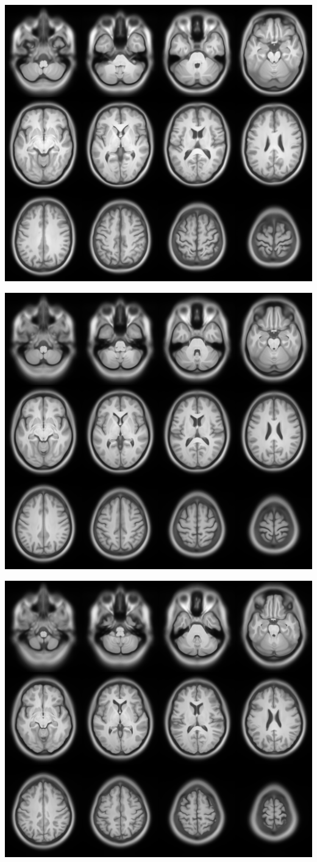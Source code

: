 \documentclass{beamer}
\begin{document}
\begin{frame}
\begin{center}
\includegraphics[width=.8\textwidth]{hyper_male}
\end{center}
\end{frame}

\begin{frame}
\begin{center}
\includegraphics[width=.8\textwidth]{avgT1}
\end{center}
\end{frame}

\begin{frame}
\begin{center}
\includegraphics[width=.8\textwidth]{hyper_female}
\end{center}
\end{frame}
\end{document}
